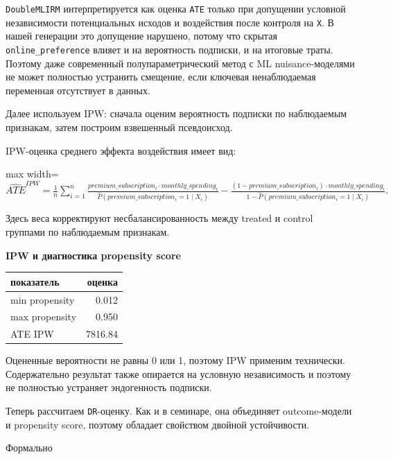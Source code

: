 \documentclass[11pt]{article}
\newcounter{none}
\begin{document}
\texttt{DoubleMLIRM} интерпретируется как оценка \texttt{ATE} только при
допущении условной независимости потенциальных исходов и воздействия
после контроля на \texttt{X}. В нашей генерации это допущение нарушено,
потому что скрытая \texttt{online\_preference} влияет и на вероятность
подписки, и на итоговые траты. Поэтому даже современный
полупараметрический метод с ML nuisance-моделями не может полностью
устранить смещение, если ключевая ненаблюдаемая переменная отсутствует в
данных.

    Далее используем IPW: сначала оценим вероятность подписки по наблюдаемым
признакам, затем построим взвешенный псевдоисход.

IPW-оценка среднего эффекта воздействия имеет вид:

\begin{center}
\begin{adjustbox}{max width=\linewidth}
\(\displaystyle \widehat{ATE}^{IPW} = \frac{1}{n}\sum\limits_{i=1}^{n}\frac{premium\_subscription_i \cdot monthly\_spending_i}{\hat{P}(premium\_subscription_i = 1 \mid X_i)} - \frac{(1 - premium\_subscription_i) \cdot monthly\_spending_i}{1 - \hat{P}(premium\_subscription_i = 1 \mid X_i)}.\)
\end{adjustbox}
\end{center}

Здесь веса корректируют несбалансированность между treated и control
группами по наблюдаемым признакам.

    \textbf{IPW и диагностика propensity score}

{\def\LTcaptype{none} %
\begin{longtable}[]{@{}lr@{}}
\toprule\noalign{}
показатель & оценка \\
\midrule\noalign{}
\endhead
\bottomrule\noalign{}
\endlastfoot
min propensity & 0.012 \\
max propensity & 0.950 \\
ATE IPW & 7816.84 \\
\end{longtable}
}

    Оцененные вероятности не равны 0 или 1, поэтому IPW применим технически.
Содержательно результат также опирается на условную независимость и
поэтому не полностью устраняет эндогенность подписки.

    Теперь рассчитаем \texttt{DR}-оценку. Как и в семинаре, она объединяет
outcome-модели и propensity score, поэтому обладает свойством двойной
устойчивости.

Формально
\end{document}
